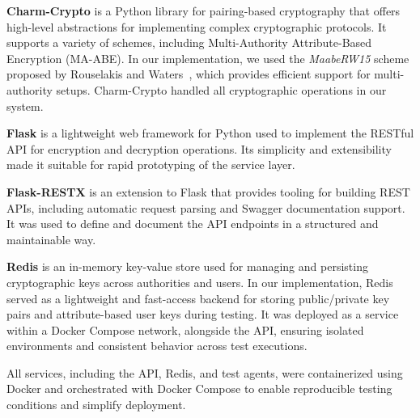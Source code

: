 \documentclass[cic,tc,english]{iiufrgs}
\begin{document}
                \textbf{Charm-Crypto} is a Python library for pairing-based cryptography that offers high-level abstractions for implementing complex cryptographic protocols. It supports a variety of schemes, including Multi-Authority Attribute-Based Encryption (MA-ABE). In our implementation, we used the \emph{MaabeRW15} scheme proposed by Rouselakis and Waters~\citep{rouselakis2015efficient}, which provides efficient support for multi-authority setups. Charm-Crypto handled all cryptographic operations in our system.

                \textbf{Flask} is a lightweight web framework for Python used to implement the RESTful API for encryption and decryption operations. Its simplicity and extensibility made it suitable for rapid prototyping of the service layer.

                \textbf{Flask-RESTX} is an extension to Flask that provides tooling for building REST APIs, including automatic request parsing and Swagger documentation support. It was used to define and document the API endpoints in a structured and maintainable way.


                \textbf{Redis} is an in-memory key-value store used for managing and persisting cryptographic keys across authorities and users. In our implementation, Redis served as a lightweight and fast-access backend for storing public/private key pairs and attribute-based user keys during testing. It was deployed as a service within a Docker Compose network, alongside the API, ensuring isolated environments and consistent behavior across test executions.

                All services, including the API, Redis, and test agents, were containerized using Docker and orchestrated with Docker Compose to enable reproducible testing conditions and simplify deployment.


\end{document}
